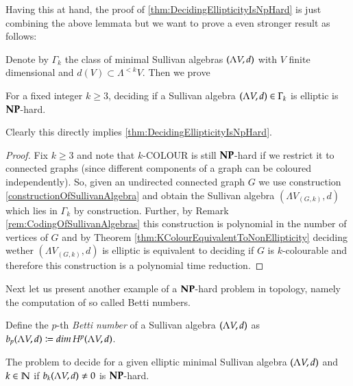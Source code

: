  Having this at hand, the proof of \ref{thm:DecidingEllipticityIsNpHard} is just combining the above lemmata but we 
 want to prove a even stronger result as follows:
 
 Denote by $\Gamma_k$ the class of minimal Sullivan algebras $(\Lambda V,d)$ with $V$ finite dimensional and
 $d(V) \subset \Lambda^{< k} V$. Then we prove
 
 \begin{Theorem}
  For a fixed integer $k \geq 3$, deciding if a Sullivan algebra $(\Lambda V,d) \in \Gamma_k$ is elliptic is $\mathbf{NP}$-hard. 
 \end{Theorem}

 Clearly this directly implies \ref{thm:DecidingEllipticityIsNpHard}.
 \begin{proof}
  Fix $k \geq 3$ and note that $k$-COLOUR is still $\mathbf{NP}$-hard if we restrict it to connected graphs (since different
  components of a graph can be coloured independently). So, given an undirected connected graph $G$ we use
  construction \ref{constructionOfSullivanAlgebra} and obtain the Sullivan algebra $(\Lambda V_{(G,k)},d)$ which lies
  in $\Gamma_k$ by construction. Further, by Remark \ref{rem:CodingOfSullivanAlgebras} this construction is polynomial
  in the number of vertices of $G$ and by Theorem \ref{thm:KColourEquivalentToNonEllipticity} deciding wether
  $(\Lambda V_{(G,k)},d)$ is elliptic is equivalent to deciding if $G$ is $k$-colourable and therefore this construction 
  is a polynomial time reduction.
 \end{proof}

 Next let us present another example of a $\mathbf{NP}$-hard problem in topology, namely the computation
 of so called Betti numbers.
 
 \begin{Definition}
  Define the $p$-th \emph{Betti number} of a Sullivan algebra $(\Lambda V,d)$ as \newline 
  ${b_p (\Lambda V,d) \coloneqq dim \, H^p (\Lambda V,d)}$.
 \end{Definition}


 \begin{Theorem}
 \label{thm:AlgebrasBettiNumbersLemma}
  The problem to decide for a given elliptic minimal Sullivan algebra $(\Lambda V,d)$ and $k \in \mathbb{N}$ if
  $b_k (\Lambda V,d) \neq 0$ is $\mathbf{NP}$-hard.
 \end{Theorem}

